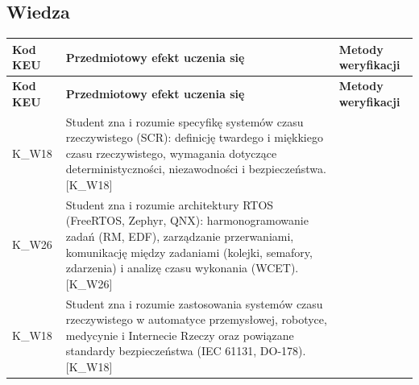 \documentclass[12pt, a4paper]{article}
\newcommand{\thdrule}{\noalign{\global\setlength{\extrarowheight}{0pt}}}
\newcommand{\thdend}{\noalign{\global\setlength{\extrarowheight}{3pt}}}
\begin{document}
\subsection*{Wiedza}
{\scriptsize
\begin{longtable}{m{1.6cm}m{9.0cm}m{4.2cm}}
\thdrule\toprule
\rowcolor{pjatkRed} {\color{white}\footnotesize\textbf{\vphantom{Ag}Kod KEU}} & {\color{white}\footnotesize\textbf{\vphantom{Ag}Przedmiotowy efekt uczenia się}} & {\color{white}\footnotesize\textbf{\vphantom{Ag}Metody weryfikacji}} \\
\midrule\thdend
\endfirsthead
\thdrule\toprule
\rowcolor{pjatkRed} {\color{white}\footnotesize\textbf{\vphantom{Ag}Kod KEU}} & {\color{white}\footnotesize\textbf{\vphantom{Ag}Przedmiotowy efekt uczenia się}} & {\color{white}\footnotesize\textbf{\vphantom{Ag}Metody weryfikacji}} \\
\midrule\thdend
\endhead
  \rowcolor{tableRowLight} K\_W18 & Student zna i rozumie specyfikę systemów czasu rzeczywistego (SCR): definicję twardego i miękkiego czasu rzeczywistego, wymagania dotyczące deterministyczności, niezawodności i bezpieczeństwa. {[}K\_W18{]} &  \\
  \rowcolor{tableRowAlt} K\_W26 & Student zna i rozumie architektury RTOS (FreeRTOS, Zephyr, QNX): harmonogramowanie zadań (RM, EDF), zarządzanie przerwaniami, komunikację między zadaniami (kolejki, semafory, zdarzenia) i analizę czasu wykonania (WCET). {[}K\_W26{]} &  \\
  \rowcolor{tableRowLight} K\_W18 & Student zna i rozumie zastosowania systemów czasu rzeczywistego w automatyce przemysłowej, robotyce, medycynie i Internecie Rzeczy oraz powiązane standardy bezpieczeństwa (IEC 61131, DO-178). {[}K\_W18{]} &  \\
\bottomrule
\end{longtable}}
\end{document}
